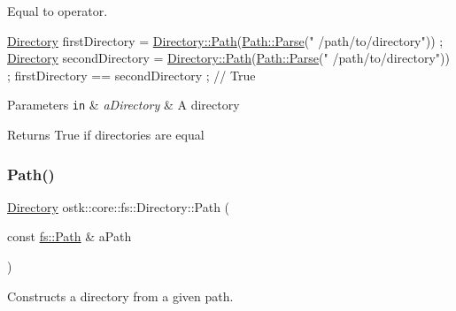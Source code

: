 Equal to operator. 


\begin{DoxyCode}
\hyperlink{classostk_1_1core_1_1fs_1_1_directory_adc893e10f55282be0d0455e9cfc5796b}{Directory} firstDirectory = \hyperlink{classostk_1_1core_1_1fs_1_1_directory_a0151dba2940d5f426b52209dc7dab2e5}{Directory::Path}(\hyperlink{classostk_1_1core_1_1fs_1_1_path_ad08539ba654f5df11c4bcb07276345ad}{Path::Parse}(\textcolor{stringliteral}{"
      /path/to/directory"})) ;
\hyperlink{classostk_1_1core_1_1fs_1_1_directory_adc893e10f55282be0d0455e9cfc5796b}{Directory} secondDirectory = \hyperlink{classostk_1_1core_1_1fs_1_1_directory_a0151dba2940d5f426b52209dc7dab2e5}{Directory::Path}(\hyperlink{classostk_1_1core_1_1fs_1_1_path_ad08539ba654f5df11c4bcb07276345ad}{Path::Parse}(\textcolor{stringliteral}{"
      /path/to/directory"})) ;
firstDirectory == secondDirectory ; \textcolor{comment}{// True}
\end{DoxyCode}



\begin{DoxyParams}[1]{Parameters}
\mbox{\tt in}  & {\em a\+Directory} & A directory \\
\hline
\end{DoxyParams}
\begin{DoxyReturn}{Returns}
True if directories are equal 
\end{DoxyReturn}
\mbox{\label{classostk_1_1core_1_1fs_1_1_directory_a0151dba2940d5f426b52209dc7dab2e5}} 
\subsubsection{\texorpdfstring{Path()}{Path()}}
{\footnotesize\ttfamily \hyperlink{classostk_1_1core_1_1fs_1_1_directory}{Directory} ostk\+::core\+::fs\+::\+Directory\+::\+Path (\begin{DoxyParamCaption}\item[{const \hyperlink{classostk_1_1core_1_1fs_1_1_path}{fs\+::\+Path} \&}]{a\+Path }\end{DoxyParamCaption})\hspace{0.3cm}{\ttfamily [static]}}



Constructs a directory from a given path. 


